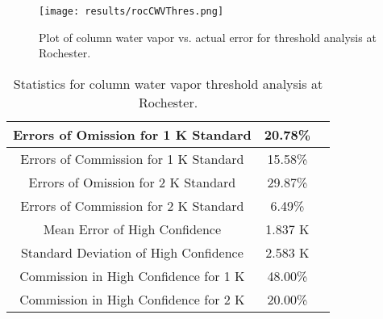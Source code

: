 \documentclass{book}
\begin{document}
\begin{minipage}[c]{0.47\textwidth}
\centering
\begin{figure}[H]
\texttt{[image: results/rocCWVThres.png]}
\caption{Plot of column water vapor vs. actual error for threshold analysis at Rochester.}
\label{fig:rocCWVThres}
\end{figure}
\end{minipage}
\begin{minipage}[c]{0.47\textwidth}
\begin{table}[H]
\centering
\footnotesize
\begin{tabular}{ | c | c | c | } \hline
Errors of Omission for 1 K Standard & 20.78\% \\ \hline
Errors of Commission for 1 K Standard & 15.58\% \\ \hline
Errors of Omission for 2 K Standard & 29.87\% \\ \hline
Errors of Commission for 2 K Standard & 6.49\% \\ \hline
Mean Error of High Confidence & 1.837 K \\ \hline
Standard Deviation of High Confidence & 2.583 K \\ \hline
Commission in High Confidence for 1 K & 48.00\% \\ \hline
Commission in High Confidence for 2 K & 20.00\% \\ \hline
\end{tabular}
\caption{Statistics for column water vapor threshold analysis at Rochester.}
\label{tab:rocCWVThres}
\end{table}
\end{minipage}
\end{document}
